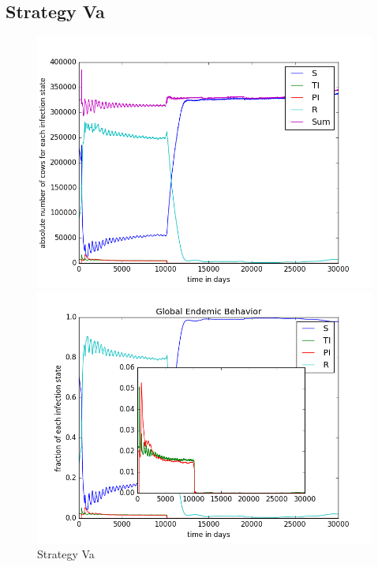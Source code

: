 \subsection{Strategy Va}

\begin{figure}[htbp]
\begin{minipage}{0.5\textwidth}
\centering
\noindent\includegraphics[width=0.95\linewidth,height=\textheight,
keepaspectratio]{cont5totalEndemicNumbers.png} 
\end{minipage}
\begin{minipage}{0.5\textwidth}
\centering
\noindent\includegraphics[width=0.95\linewidth,height=\textheight,
keepaspectratio]{cont5pendemicFractions.png} 
\end{minipage}
\caption[Endemic Behavior in Containment Strategy Five A]{Strategy Va}
\label{fig:contStrat5a}
\end{figure}
